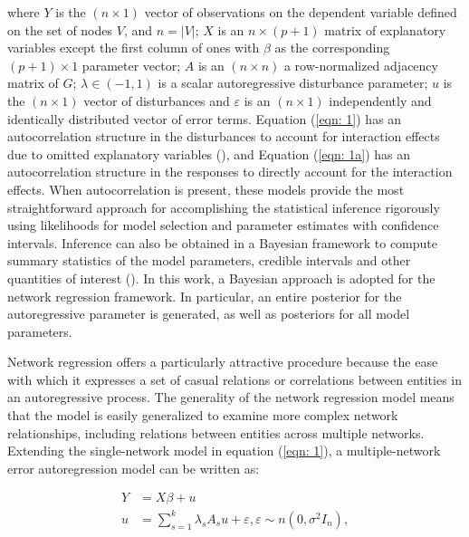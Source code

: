 \documentclass[times, doublespace]{auth}
\begin{document}
\noindent where $Y$ is the $(n \times 1)$ vector of observations on the dependent variable defined on the set of nodes $V$, and $n = \vert V\vert$; $X$ is an $n \times (p+1)$ matrix of explanatory variables except the first column of ones with $\beta$ as the corresponding $(p+1) \times 1$ parameter vector; $A$ is an $(n \times n)$ a row-normalized adjacency matrix of $G$; $\lambda \in (-1,1)$ is a scalar autoregressive disturbance parameter; $u$ is the $(n \times 1)$ vector of disturbances and $\varepsilon$ is an $(n \times 1)$ independently and identically distributed vector of error terms. Equation (\ref{eqn: 1}) has an autocorrelation structure in the disturbances to account for interaction effects due to omitted explanatory variables (\cite{R36}), and Equation (\ref{eqn: 1a}) has an autocorrelation structure in the responses to directly account for the interaction effects. When autocorrelation is present, these models provide the most straightforward approach for accomplishing the statistical inference rigorously using likelihoods for model selection and parameter estimates with confidence intervals. Inference can also be obtained in a Bayesian framework to compute summary statistics of the model parameters, credible intervals and other quantities of interest (\cite{R37}). In this work, a Bayesian approach is adopted for the network regression framework. In particular, an entire posterior for the autoregressive parameter is generated, as well as posteriors for all model parameters. 
\newline

Network regression offers a particularly attractive procedure because the ease with which it expresses a set of casual relations or correlations between entities in an autoregressive process. The generality of the network regression model means that the model is easily generalized to examine more complex network relationships, including relations between entities across multiple networks. Extending the single-network model in equation (\ref{eqn: 1}), a multiple-network error autoregression model can be written as:

\begin{equation}
\label{eqn: 2}
\begin{array}{rl}
Y &= X\beta + u\\
u &= \sum\limits_{s=1}^{k} \lambda_{s}A_{s} u + \varepsilon, \varepsilon \sim n(0, \sigma^{2}I_{n}),
\end{array}
\end{equation}
\end{document}
